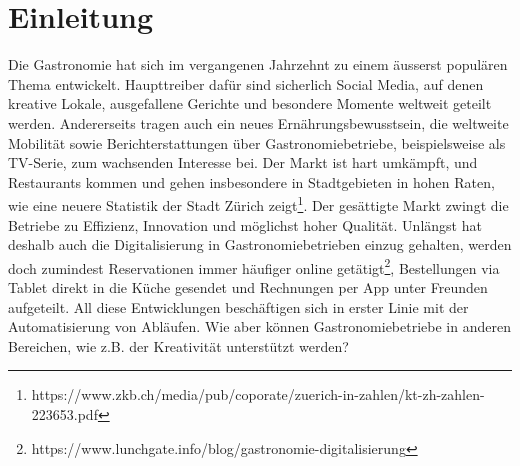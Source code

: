 \chapter{Einleitung}
\label{ch:introduction}

Die Gastronomie hat sich im vergangenen Jahrzehnt zu einem äusserst populären Thema entwickelt.
Haupttreiber dafür sind sicherlich Social Media, auf denen kreative Lokale, ausgefallene Gerichte und besondere
Momente weltweit geteilt werden.
Andererseits tragen auch ein neues Ernährungsbewusstsein, die weltweite Mobilität sowie Berichterstattungen über Gastronomiebetriebe, beispielsweise als TV-Serie, zum wachsenden Interesse bei.
Der Markt ist hart umkämpft, und Restaurants kommen und gehen insbesondere in Stadtgebieten in hohen Raten, wie eine neuere
Statistik der Stadt Zürich zeigt\footnote{https://www.zkb.ch/media/pub/coporate/zuerich-in-zahlen/kt-zh-zahlen-223653.pdf}.
Der gesättigte Markt zwingt die Betriebe zu Effizienz, Innovation und möglichst hoher Qualität.
Unlängst hat deshalb auch die Digitalisierung in Gastronomiebetrieben einzug gehalten, werden doch zumindest Reservationen immer
häufiger online getätigt\footnote{https://www.lunchgate.info/blog/gastronomie-digitalisierung}, Bestellungen via Tablet
direkt in die Küche gesendet und Rechnungen per App unter Freunden aufgeteilt.
All diese Entwicklungen beschäftigen sich in erster Linie mit der Automatisierung von Abläufen.
Wie aber können Gastronomiebetriebe in anderen Bereichen, wie z.B. der Kreativität unterstützt werden?